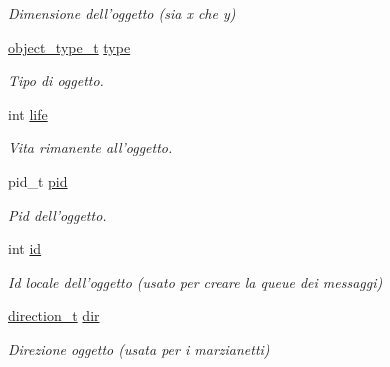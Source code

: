 \begin{DoxyCompactItemize}
\begin{DoxyCompactList}\small\item\em Dimensione dell'oggetto (sia x che y) \item\end{DoxyCompactList}\item 
\hypertarget{structobject__data__t_a48fcf5fc14cd1543c847cbd3a13b5c77}{
\hyperlink{space__invaders_8h_a3af7baddc641a3b4f5a9189b589eccf7}{object\_\-type\_\-t} \hyperlink{structobject__data__t_a48fcf5fc14cd1543c847cbd3a13b5c77}{type}}
\label{structobject__data__t_a48fcf5fc14cd1543c847cbd3a13b5c77}

\begin{DoxyCompactList}\small\item\em Tipo di oggetto. \item\end{DoxyCompactList}\item 
\hypertarget{structobject__data__t_af1092c54c97d271905181362ea8cbd78}{
int \hyperlink{structobject__data__t_af1092c54c97d271905181362ea8cbd78}{life}}
\label{structobject__data__t_af1092c54c97d271905181362ea8cbd78}

\begin{DoxyCompactList}\small\item\em Vita rimanente all'oggetto. \item\end{DoxyCompactList}\item 
\hypertarget{structobject__data__t_a050d5314c9aa819ccc31ec8b98dd70a7}{
pid\_\-t \hyperlink{structobject__data__t_a050d5314c9aa819ccc31ec8b98dd70a7}{pid}}
\label{structobject__data__t_a050d5314c9aa819ccc31ec8b98dd70a7}

\begin{DoxyCompactList}\small\item\em Pid dell'oggetto. \item\end{DoxyCompactList}\item 
\hypertarget{structobject__data__t_a0b947c14da562c8ba31ff276caa8a765}{
int \hyperlink{structobject__data__t_a0b947c14da562c8ba31ff276caa8a765}{id}}
\label{structobject__data__t_a0b947c14da562c8ba31ff276caa8a765}

\begin{DoxyCompactList}\small\item\em Id locale dell'oggetto (usato per creare la queue dei messaggi) \item\end{DoxyCompactList}\item 
\hypertarget{structobject__data__t_aabe25702b6a6537183f4b06898e95dfa}{
\hyperlink{space__invaders_8h_ae9ae980041e438eed7a3af43ce4e9f6b}{direction\_\-t} \hyperlink{structobject__data__t_aabe25702b6a6537183f4b06898e95dfa}{dir}}
\label{structobject__data__t_aabe25702b6a6537183f4b06898e95dfa}

\begin{DoxyCompactList}\small\item\em Direzione oggetto (usata per i marzianetti) \item\end{DoxyCompactList}\end{DoxyCompactItemize}


